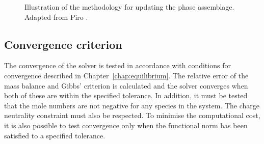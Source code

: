 \begin{landscape}
\begin{figure}[ht]
  		\caption[Illustration of the methodology for updating the phase assemblage.]{Illustration of the methodology for updating the phase assemblage. Adapted from Piro \cite{Piro17}.}
  		\label{fig:assemblage}
	\end{figure}

\end{landscape}
\restoregeometry

\subsection{Convergence criterion}
	The convergence of the solver is tested in accordance with conditions for convergence described in Chapter~\ref{chap:equilibrium}. The relative error of the mass balance and Gibbs' criterion is calculated  and the solver converges when both of these are within the specified tolerance. In addition, it must be tested that the mole numbers are not negative for any species in the system. The charge neutrality constraint must also be respected.  To minimise the computational cost, it is also possible to test convergence only when the functional norm has been satisfied to a specified tolerance.

